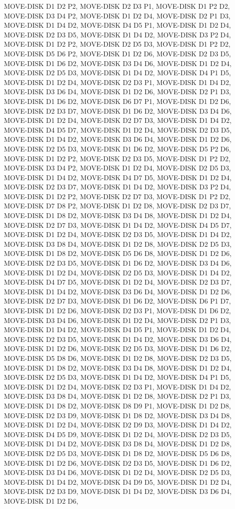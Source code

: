\documentclass[12pt]{article}
\begin{document}
\begin{appendix}
\begin{itemize}
 MOVE-DISK D1 D2 P2,  MOVE-DISK D2 D3 P1,  MOVE-DISK D1 P2 D2,  MOVE-DISK D3 D4 P2,  MOVE-DISK D1 D2 D4, MOVE-DISK D2 P1 D3,  MOVE-DISK D1 D4 D2,  MOVE-DISK D4 D5 P1,  MOVE-DISK D1 D2 D4,  MOVE-DISK D2 D3 D5,  MOVE-DISK D1 D4 D2,  MOVE-DISK D3 P2 D4,  MOVE-DISK D1 D2 P2,  MOVE-DISK D2 D5 D3,  MOVE-DISK D1 P2 D2,  MOVE-DISK D5 D6 P2,  MOVE-DISK D1 D2 D6,  MOVE-DISK D2 D3 D5,  MOVE-DISK D1 D6 D2,  MOVE-DISK D3 D4 D6,  MOVE-DISK D1 D2 D4,  MOVE-DISK D2 D5 D3,  MOVE-DISK D1 D4 D2,  MOVE-DISK D4 P1 D5,  MOVE-DISK D1 D2 D4,  MOVE-DISK D2 D3 P1,  MOVE-DISK D1 D4 D2,  MOVE-DISK D3 D6 D4,  MOVE-DISK D1 D2 D6,  MOVE-DISK D2 P1 D3,  MOVE-DISK D1 D6 D2,  MOVE-DISK D6 D7 P1,  MOVE-DISK D1 D2 D6,  MOVE-DISK D2 D3 D7,  MOVE-DISK D1 D6 D2,  MOVE-DISK D3 D4 D6,  MOVE-DISK D1 D2 D4,  MOVE-DISK D2 D7 D3,  MOVE-DISK D1 D4 D2,  MOVE-DISK D4 D5 D7,  MOVE-DISK D1 D2 D4,  MOVE-DISK D2 D3 D5,  MOVE-DISK D1 D4 D2,  MOVE-DISK D3 D6 D4,  MOVE-DISK D1 D2 D6,  MOVE-DISK D2 D5 D3,  MOVE-DISK D1 D6 D2,  MOVE-DISK D5 P2 D6,  MOVE-DISK D1 D2 P2,  MOVE-DISK D2 D3 D5,  MOVE-DISK D1 P2 D2,  MOVE-DISK D3 D4 P2,  MOVE-DISK D1 D2 D4,  MOVE-DISK D2 D5 D3,  MOVE-DISK D1 D4 D2,  MOVE-DISK D4 D7 D5,  MOVE-DISK D1 D2 D4,  MOVE-DISK D2 D3 D7,  MOVE-DISK D1 D4 D2,  MOVE-DISK D3 P2 D4,  MOVE-DISK D1 D2 P2,  MOVE-DISK D2 D7 D3,  MOVE-DISK D1 P2 D2,  MOVE-DISK D7 D8 P2,  MOVE-DISK D1 D2 D8,  MOVE-DISK D2 D3 D7,  MOVE-DISK D1 D8 D2,  MOVE-DISK D3 D4 D8,  MOVE-DISK D1 D2 D4,  MOVE-DISK D2 D7 D3,  MOVE-DISK D1 D4 D2,  MOVE-DISK D4 D5 D7,  MOVE-DISK D1 D2 D4,  MOVE-DISK D2 D3 D5,  MOVE-DISK D1 D4 D2,  MOVE-DISK D3 D8 D4,  MOVE-DISK D1 D2 D8,  MOVE-DISK D2 D5 D3,  MOVE-DISK D1 D8 D2,  MOVE-DISK D5 D6 D8,  MOVE-DISK D1 D2 D6,  MOVE-DISK D2 D3 D5,  MOVE-DISK D1 D6 D2,  MOVE-DISK D3 D4 D6,  MOVE-DISK D1 D2 D4,  MOVE-DISK D2 D5 D3,  MOVE-DISK D1 D4 D2,  MOVE-DISK D4 D7 D5,  MOVE-DISK D1 D2 D4,  MOVE-DISK D2 D3 D7,  MOVE-DISK D1 D4 D2,  MOVE-DISK D3 D6 D4,  MOVE-DISK D1 D2 D6,  MOVE-DISK D2 D7 D3,  MOVE-DISK D1 D6 D2,  MOVE-DISK D6 P1 D7,  MOVE-DISK D1 D2 D6,  MOVE-DISK D2 D3 P1,  MOVE-DISK D1 D6 D2,  MOVE-DISK D3 D4 D6,  MOVE-DISK D1 D2 D4,  MOVE-DISK D2 P1 D3,  MOVE-DISK D1 D4 D2,  MOVE-DISK D4 D5 P1,  MOVE-DISK D1 D2 D4,  MOVE-DISK D2 D3 D5,  MOVE-DISK D1 D4 D2,  MOVE-DISK D3 D6 D4,  MOVE-DISK D1 D2 D6,  MOVE-DISK D2 D5 D3,  MOVE-DISK D1 D6 D2,  MOVE-DISK D5 D8 D6,  MOVE-DISK D1 D2 D8,  MOVE-DISK D2 D3 D5,  MOVE-DISK D1 D8 D2,  MOVE-DISK D3 D4 D8,  MOVE-DISK D1 D2 D4,  MOVE-DISK D2 D5 D3,  MOVE-DISK D1 D4 D2,  MOVE-DISK D4 P1 D5,  MOVE-DISK D1 D2 D4,  MOVE-DISK D2 D3 P1,  MOVE-DISK D1 D4 D2,  MOVE-DISK D3 D8 D4,  MOVE-DISK D1 D2 D8,  MOVE-DISK D2 P1 D3,  MOVE-DISK D1 D8 D2,  MOVE-DISK D8 D9 P1,  MOVE-DISK D1 D2 D8,  MOVE-DISK D2 D3 D9,  MOVE-DISK D1 D8 D2,  MOVE-DISK D3 D4 D8,  MOVE-DISK D1 D2 D4,  MOVE-DISK D2 D9 D3,  MOVE-DISK D1 D4 D2,  MOVE-DISK D4 D5 D9,  MOVE-DISK D1 D2 D4,  MOVE-DISK D2 D3 D5,  MOVE-DISK D1 D4 D2,  MOVE-DISK D3 D8 D4,  MOVE-DISK D1 D2 D8,  MOVE-DISK D2 D5 D3,  MOVE-DISK D1 D8 D2,  MOVE-DISK D5 D6 D8,  MOVE-DISK D1 D2 D6,  MOVE-DISK D2 D3 D5,  MOVE-DISK D1 D6 D2,  MOVE-DISK D3 D4 D6,  MOVE-DISK D1 D2 D4,  MOVE-DISK D2 D5 D3,  MOVE-DISK D1 D4 D2,  MOVE-DISK D4 D9 D5,  MOVE-DISK D1 D2 D4,  MOVE-DISK D2 D3 D9,  MOVE-DISK D1 D4 D2,  MOVE-DISK D3 D6 D4,  MOVE-DISK D1 D2 D6,  
\end{itemize}
\end{appendix}
\end{document}
